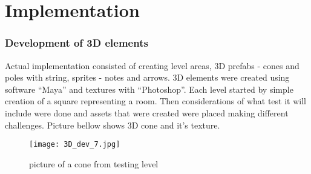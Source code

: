 \chapter{Implementation}

\subsection{Development of 3D elements}
Actual implementation consisted of creating level areas, 3D prefabs - cones and poles with string, sprites - notes and arrows. 3D elements were created using software “Maya” and textures with “Photoshop”. Each level started by simple creation of a square representing a room. Then considerations of what test it will include were done and assets that were created were placed making different challenges. Picture bellow shows 3D cone and it’s texture. 
\begin{figure}[H]
\centering
\texttt{[image: 3D\_dev\_7.jpg]}
\caption{picture of a cone from testing level}
\end{figure}

